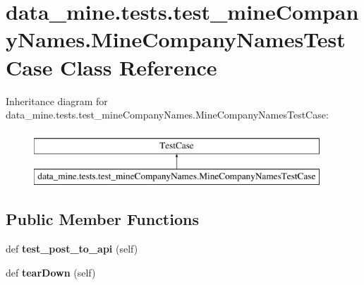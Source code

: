 \hypertarget{classdata__mine_1_1tests_1_1test__mine_company_names_1_1_mine_company_names_test_case}{}\section{data\+\_\+mine.\+tests.\+test\+\_\+mine\+Company\+Names.\+Mine\+Company\+Names\+Test\+Case Class Reference}
\label{classdata__mine_1_1tests_1_1test__mine_company_names_1_1_mine_company_names_test_case}
Inheritance diagram for data\+\_\+mine.\+tests.\+test\+\_\+mine\+Company\+Names.\+Mine\+Company\+Names\+Test\+Case\+:\begin{figure}[H]
\begin{center}
\leavevmode
\includegraphics[height=2.000000cm]{classdata__mine_1_1tests_1_1test__mine_company_names_1_1_mine_company_names_test_case}
\end{center}
\end{figure}
\subsection*{Public Member Functions}
\begin{DoxyCompactItemize}
\item 
\mbox{\label{classdata__mine_1_1tests_1_1test__mine_company_names_1_1_mine_company_names_test_case_a1d2e0811c2e6cec98e4a44bab307816e}} 
def {\bfseries test\+\_\+post\+\_\+to\+\_\+api} (self)
\item 
\mbox{\label{classdata__mine_1_1tests_1_1test__mine_company_names_1_1_mine_company_names_test_case_adbbbbf0c3370a4b298d0bd033ff52182}} 
def {\bfseries tear\+Down} (self)
\end{DoxyCompactItemize}
